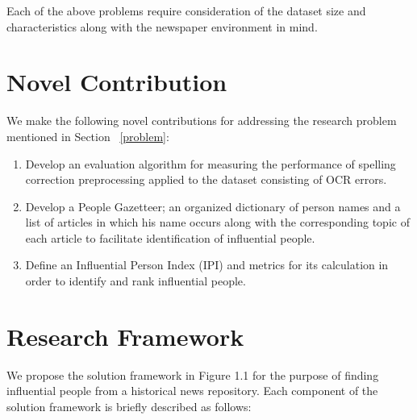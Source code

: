 Each of the above problems require consideration of the dataset size and characteristics along with the newspaper environment in mind. 





\section{Novel Contribution}
We make the following novel contributions for addressing the research problem mentioned in Section ~\ref{problem}:
\begin{enumerate}
\item Develop an evaluation algorithm for measuring the performance of spelling correction preprocessing applied to the dataset consisting of OCR errors.
\item Develop a People Gazetteer; an organized  dictionary of person names and a list of articles in which his name occurs along with the corresponding topic of each article to facilitate identification of influential people.
\item Define an Influential Person Index (IPI) and metrics for its calculation in order to identify and rank influential people.
\end{enumerate}


\section {Research Framework }

We propose the solution framework in Figure 1.1 for the purpose of finding influential people from a historical news repository. Each component of the solution framework is briefly described as follows:

